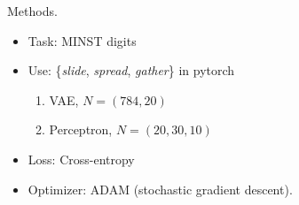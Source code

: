 \documentclass[10pt]{beamer}
\begin{document}

\begin{frame}[fragile]{Methods.}
\begin{itemize}
    \item Task: MINST digits
    \item Use: \{\textit{slide}, \textit{spread}, \textit{gather}\} in pytorch
    \begin{enumerate}
        \item VAE, $N=(784,20)$
        \item Perceptron, $N=(20,30,10)$    
    \end{enumerate}
    \item Loss: Cross-entropy
    \item Optimizer: ADAM (stochastic gradient descent).
\end{itemize}
\end{frame}
\end{document}
